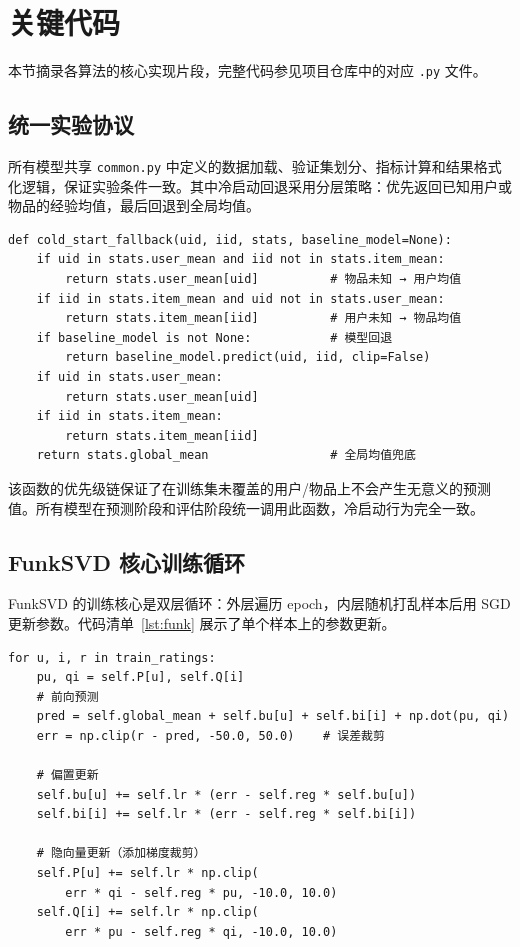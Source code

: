 \documentclass[UTF8,a4paper,10pt]{ctexart}
\begin{document}
\section{关键代码}

本节摘录各算法的核心实现片段，完整代码参见项目仓库中的对应 \texttt{.py} 文件。

\subsection{统一实验协议}

所有模型共享 \texttt{common.py} 中定义的数据加载、验证集划分、指标计算和结果格式化逻辑，保证实验条件一致。其中冷启动回退采用分层策略：优先返回已知用户或物品的经验均值，最后回退到全局均值。

\begin{lstlisting}[caption={分层冷启动回退（\texttt{common.py}）}, label={lst:coldstart}]
def cold_start_fallback(uid, iid, stats, baseline_model=None):
    if uid in stats.user_mean and iid not in stats.item_mean:
        return stats.user_mean[uid]          # 物品未知 → 用户均值
    if iid in stats.item_mean and uid not in stats.user_mean:
        return stats.item_mean[iid]          # 用户未知 → 物品均值
    if baseline_model is not None:           # 模型回退
        return baseline_model.predict(uid, iid, clip=False)
    if uid in stats.user_mean:
        return stats.user_mean[uid]
    if iid in stats.item_mean:
        return stats.item_mean[iid]
    return stats.global_mean                 # 全局均值兜底
\end{lstlisting}

该函数的优先级链保证了在训练集未覆盖的用户/物品上不会产生无意义的预测值。所有模型在预测阶段和评估阶段统一调用此函数，冷启动行为完全一致。

\subsection{FunkSVD 核心训练循环}

FunkSVD 的训练核心是双层循环：外层遍历 epoch，内层随机打乱样本后用 SGD 更新参数。代码清单~\ref{lst:funk} 展示了单个样本上的参数更新。

\begin{lstlisting}[caption={FunkSVD 单步 SGD 更新（\texttt{funk\_svd.py}）}, label={lst:funk}]
for u, i, r in train_ratings:
    pu, qi = self.P[u], self.Q[i]
    # 前向预测
    pred = self.global_mean + self.bu[u] + self.bi[i] + np.dot(pu, qi)
    err = np.clip(r - pred, -50.0, 50.0)    # 误差裁剪

    # 偏置更新
    self.bu[u] += self.lr * (err - self.reg * self.bu[u])
    self.bi[i] += self.lr * (err - self.reg * self.bi[i])

    # 隐向量更新（添加梯度裁剪）
    self.P[u] += self.lr * np.clip(
        err * qi - self.reg * pu, -10.0, 10.0)
    self.Q[i] += self.lr * np.clip(
        err * pu - self.reg * qi, -10.0, 10.0)
\end{lstlisting}
\end{document}
